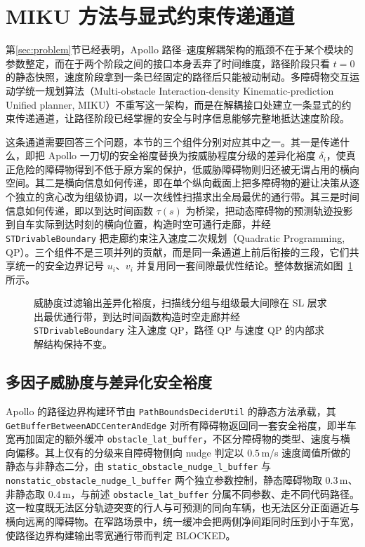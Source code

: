 \documentclass[a4paper,11pt]{ctexart}
\theoremstyle{definition}
\begin{document}

\section{MIKU 方法与显式约束传递通道}
\label{sec:method}

第\ref{sec:problem}节已经表明，Apollo 路径--速度解耦架构的瓶颈不在于某个模块的参数整定，而在于两个阶段之间的接口本身丢弃了时间维度，路径阶段只看 $t=0$ 的静态快照，速度阶段拿到一条已经固定的路径后只能被动制动。多障碍物交互运动学统一规划算法（Multi-obstacle Interaction-density Kinematic-prediction Unified planner, MIKU）不重写这一架构，而是在解耦接口处建立一条显式的约束传递通道，让路径阶段已经掌握的安全与时序信息能够完整地抵达速度阶段。

这条通道需要回答三个问题，本节的三个组件分别对应其中之一。其一是传递什么，即把 Apollo 一刀切的安全裕度替换为按威胁程度分级的差异化裕度 $\delta_i$，使真正危险的障碍物得到不低于原方案的保护，低威胁障碍物则归还被无谓占用的横向空间。其二是横向信息如何传递，即在单个纵向截面上把多障碍物的避让决策从逐个独立的贪心改为组级协调，以一次线性扫描求出全局最优的通行带。其三是时间信息如何传递，即以到达时间函数 $\tau(s)$ 为桥梁，把动态障碍物的预测轨迹投影到自车实际到达时刻的横向位置，构造时空可通行走廊，并经 \texttt{STDrivableBoundary} 把走廊约束注入速度二次规划（Quadratic Programming, QP）。三个组件不是三项并列的贡献，而是同一条通道上前后衔接的三段，它们共享统一的安全边界记号 $u_i$、$v_i$ 并复用同一套间隙最优性结论。整体数据流如图~\ref{fig:algorithm_flow} 所示。

\begin{figure}[htbp]
\centering
{}
\caption{MIKU 显式约束传递通道的整体数据流}
\caption*{威胁度过滤输出差异化裕度，扫描线分组与组级最大间隙在 SL 层求出最优通行带，到达时间函数构造时空走廊并经 \texttt{STDrivableBoundary} 注入速度 QP，路径 QP 与速度 QP 的内部求解结构保持不变。}
\label{fig:algorithm_flow}
\end{figure}

\subsection{多因子威胁度与差异化安全裕度}
\label{sec:method_threat}

Apollo 的路径边界构建环节由 \texttt{PathBoundsDeciderUtil} 的静态方法承载，其 \texttt{GetBufferBetweenADCCenterAndEdge} 对所有障碍物返回同一套安全裕度，即半车宽再加固定的额外缓冲 \texttt{obstacle\_lat\_buffer}，不区分障碍物的类型、速度与横向偏移。其上仅有的分级来自障碍物侧向 nudge 判定以 $0.5$\,m/s 速度阈值所做的静态与非静态二分，由 \texttt{static\_obstacle\_nudge\_l\_buffer} 与 \texttt{nonstatic\_obstacle\_nudge\_l\_buffer} 两个独立参数控制，静态障碍物取 $0.3$\,m、非静态取 $0.4$\,m，与前述 \texttt{obstacle\_lat\_buffer} 分属不同参数、走不同代码路径。这一粒度既无法区分轨迹突变的行人与可预测的同向车辆，也无法区分正面逼近与横向远离的障碍物。在窄路场景中，统一缓冲会把两侧净间距同时压到小于车宽，使路径边界构建输出零宽通行带而判定 BLOCKED。
\end{document}

